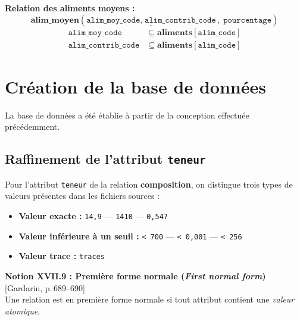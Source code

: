\documentclass[12pt, a4paper]{article}
\newcommand{\attr}[1]{\texttt{#1}}
\newcommand{\citeg}[1]{\textnormal{\footnotesize[#1]}}
\begin{document}
    \bigskip
    \noindent\textbf{Relation des aliments moyens :}
    \[
        \textbf{alim\_moyen}(\underline{\attr{alim\_moy\_code},\; \attr{alim\_contrib\_code}},\; \attr{pourcentage})
    \]
    \begin{align*}
        \attr{alim\_moy\_code}    &\subseteq \textbf{aliments}[\attr{alim\_code}] \\
        \attr{alim\_contrib\_code}&\subseteq \textbf{aliments}[\attr{alim\_code}]
    \end{align*}



    \section{Création de la base de données}

    La base de données a été établie à partir de la conception effectuée précédemment.


    \subsection{Raffinement de l'attribut \texttt{teneur}}

    Pour l'attribut \attr{teneur} de la relation \textbf{composition}, on distingue trois types de valeurs
    présentes dans les fichiers sources :

    \begin{itemize}
        \item \textbf{Valeur exacte :} \texttt{14,9} — \texttt{1410} — \texttt{0,547}
        \item \textbf{Valeur inférieure à un seuil :} \texttt{< 700} — \texttt{< 0,001} — \texttt{< 256}
        \item \textbf{Valeur trace :} \texttt{traces}
    \end{itemize}
    \bigskip
    \begin{rappelbox}
        \textbf{Notion XVII.9 : Première forme normale (\textit{First normal form})}
        \hfill\citeg{Gardarin, p.\,689--690}\\[0.5em]
        Une relation est en première forme normale si tout attribut contient une \emph{valeur atomique}.
    \end{rappelbox}
\end{document}
